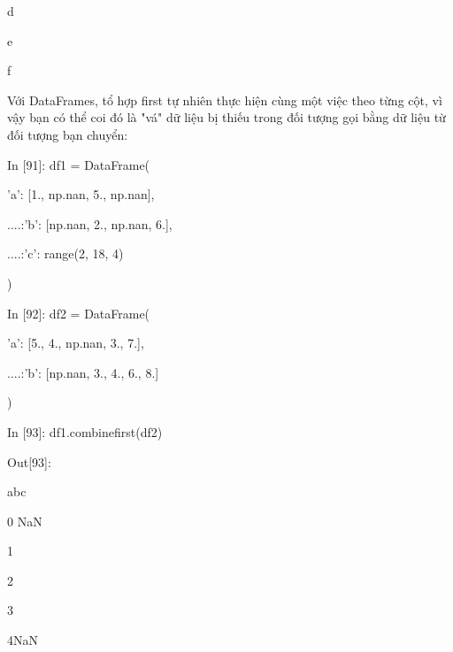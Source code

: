 \par\quad\textup d
\par\quad\textup e
\par\quad\textup f
\par\quad\textup Với DataFrames, tổ hợp first tự nhiên thực hiện cùng một việc theo từng cột, vì vậy bạn
có thể coi đó là "vá" dữ liệu bị thiếu trong đối tượng gọi bằng dữ liệu từ đối tượng bạn
chuyển:
\par\quad\textup In [91]: df1 = DataFrame({'a': [1., np.nan, 5., np.nan],
\par\quad\textup\quad ....:\quad\quad\quad\quad\quad\quad\quad\quad 'b': [np.nan, 2., np.nan, 6.],
\par\quad\textup\quad  ....:\quad\quad\quad\quad\quad\quad\quad\quad 'c': range(2, 18, 4)})
\par\quad\textup In [92]: df2 = DataFrame({'a': [5., 4., np.nan, 3., 7.],
\par\quad\textup\quad  ....:\quad\quad\quad\quad\quad\quad\quad\quad 'b': [np.nan, 3., 4., 6., 8.]})
\par\quad\textup In [93]: df1.combine\textunderscore first(df2)
\par\quad\textup Out[93]:
\par\quad\textup\quad\quad a\quad b\quad c
\par\quad\textup 0 NaN
\par\quad\textup 1
\par\quad\textup 2
\par\quad\textup 3
\par\quad\textup 4\quad NaN


